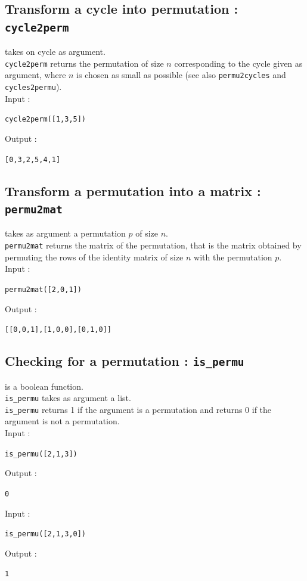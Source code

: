 \documentclass[a4paper,11pt]{book}
\begin{document}
\subsection{Transform a cycle into permutation : {\tt cycle2perm}}
 takes on cycle as argument.\\
{\tt cycle2perm} returns the permutation of size $n$ corresponding 
to the cycle given as argument, where $n$  is chosen as small 
as possible (see also {\tt permu2cycles} and {\tt cycles2permu}).\\
Input :
\begin{center}{\tt cycle2perm([1,3,5])}\end{center}
Output :
\begin{center}{\tt [0,3,2,5,4,1]}\end{center}

\subsection{Transform a permutation into a matrix : {\tt permu2mat}}
 takes as argument a permutation $p$ of size $n$.\\
{\tt permu2mat} returns the matrix of the permutation, that is
the matrix obtained by permuting the rows of the identity matrix of size $n$
with the permutation $p$.\\
Input :
\begin{center}{\tt permu2mat([2,0,1])}\end{center}
Output :
\begin{center}{\tt [[0,0,1],[1,0,0],[0,1,0]]}\end{center}

\subsection{Checking for a permutation : {\tt is\_permu}}
 is a  boolean function.\\
{\tt is\_permu} takes as argument a list.\\
{\tt is\_permu} returns 1 if the argument is a permutation and returns 0 if the
argument is not a permutation.\\
Input :
\begin{center}{\tt is\_permu([2,1,3]) }\end{center}
Output :
\begin{center}{\tt 0}\end{center}
Input :
\begin{center}{\tt is\_permu([2,1,3,0]) }\end{center}
Output :
\begin{center}{\tt 1}\end{center}
\end{document}

